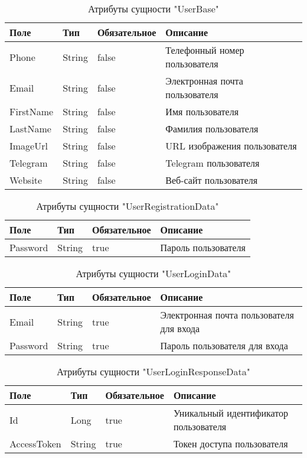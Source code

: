 \begin{xltabular}{\textwidth}{|l|l|p{1.7cm}|X|}
    \caption{Атрибуты сущности "UserBase"}\\ \hline
    Поле & Тип & Обяза\-тельное & Описание \\ \hline
    Phone & String & false & Телефонный номер пользователя \\ \hline
    Email & String & false & Электронная почта пользователя \\ \hline
    FirstName & String & false & Имя пользователя \\ \hline
    LastName & String & false & Фамилия пользователя \\ \hline
    ImageUrl & String & false & URL изображения пользователя \\ \hline
    Telegram & String & false & Telegram пользователя \\ \hline
    Website & String & false & Веб-сайт пользователя \\ \hline
\end{xltabular}

\begin{xltabular}{\textwidth}{|l|l|p{1.7cm}|X|}
    \caption{Атрибуты сущности "UserRegistrationData"}\\ \hline
    Поле & Тип & Обяза\-тельное & Описание \\ \hline
    Password & String & true & Пароль пользователя \\ \hline
\end{xltabular}

\begin{xltabular}{\textwidth}{|l|l|p{1.7cm}|X|}
    \caption{Атрибуты сущности "UserLoginData"}\\ \hline
    Поле & Тип & Обяза\-тельное & Описание \\ \hline
    Email & String & true & Электронная почта пользователя для входа \\ \hline
    Password & String & true & Пароль пользователя для входа \\ \hline
\end{xltabular}

\begin{xltabular}{\textwidth}{|l|l|p{1.7cm}|X|}
    \caption{Атрибуты сущности "UserLoginResponseData"}\\ \hline
    Поле & Тип & Обяза\-тельное & Описание \\ \hline
    Id & Long & true & Уникальный идентификатор пользователя \\ \hline
    AccessToken & String & true & Токен доступа пользователя \\ \hline
\end{xltabular}

